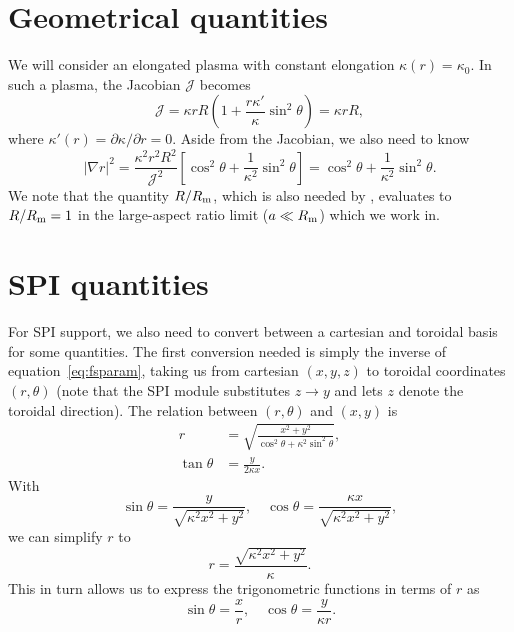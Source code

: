 \documentclass{notes}
\newcommand{\Rm}{R_{\rm m}}
\newcommand{\Jac}{\mathcal{J}}
\begin{document}
    \section{Geometrical quantities}
    We will consider an elongated plasma with constant elongation
    $\kappa(r)=\kappa_0$. In such a plasma, the Jacobian $\Jac$ becomes
    \begin{equation}
        \Jac = \kappa r R\left(
            1 + \frac{r\kappa'}{\kappa}\sin^2\theta
        \right) = \kappa rR,
    \end{equation}
    where $\kappa'(r) = \partial\kappa/\partial r = 0$. Aside from the Jacobian,
    we also need to know 
    \begin{equation}
        \left|\nabla r\right|^2 = \frac{\kappa^2r^2R^2}{\Jac^2}\left[
            \cos^2\theta + \frac{1}{\kappa^2}\sin^2\theta
        \right] =
        \cos^2\theta + \frac{1}{\kappa^2}\sin^2\theta.
    \end{equation}
    We note that the quantity $R/\Rm$, which is also needed by \STREAM,
    evaluates to $R/\Rm=1$ in the large-aspect ratio limit ($a\ll\Rm$) which we
    work in.

    \section{SPI quantities}
    For SPI support, we also need to convert between a cartesian and toroidal
    basis for some quantities. The first conversion needed is simply the
    inverse of equation~\eqref{eq:fsparam}, taking us from cartesian $(x,y,z)$
    to toroidal coordinates $(r,\theta)$ (note that the SPI module substitutes
    $z\to y$ and lets $z$ denote the toroidal direction). The relation between
    $(r,\theta)$ and $(x,y)$ is
    \begin{equation}
        \begin{aligned}
            r &= \sqrt{\frac{x^2+y^2}{\cos^2\theta+\kappa^2\sin^2\theta}},\\
            \tan\theta &= \frac{y}{2\kappa x}.
        \end{aligned}
    \end{equation}
    With
    \begin{equation}
        \sin\theta = \frac{y}{\sqrt{\kappa^2x^2 + y^2}},\quad
        \cos\theta = \frac{\kappa x}{\sqrt{\kappa^2x^2 + y^2}},
    \end{equation}
    we can simplify $r$ to
    \begin{equation}\label{eq:cartr}
        r = \frac{\sqrt{\kappa^2x^2 + y^2}}{\kappa}.
    \end{equation}
    This in turn allows us to express the trigonometric functions in terms of
    $r$ as
    \begin{equation}
        \sin\theta = \frac{x}{r},\quad \cos\theta = \frac{y}{\kappa r}.
    \end{equation}
\end{document}
